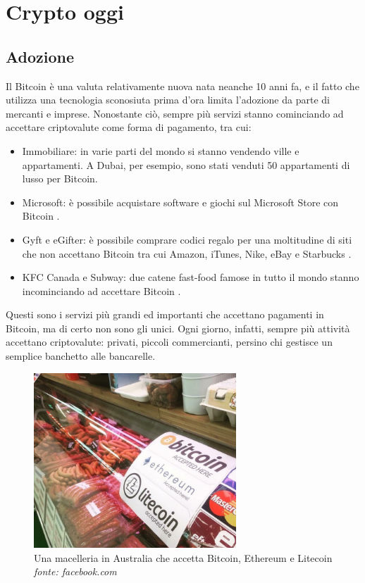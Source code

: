 \documentclass {article}
\begin{document}
\newpage
\null
\newpage


\section {Crypto oggi}


\subsection {Adozione}


Il Bitcoin è una valuta relativamente nuova nata neanche 10 anni fa, e il fatto che utilizza una tecnologia sconosiuta prima d'ora limita l'adozione da parte di mercanti e imprese.
Nonostante ciò, sempre più servizi stanno cominciando ad accettare criptovalute come forma di pagamento, tra cui:

\begin{itemize}
\item Immobiliare: in varie parti del mondo si stanno vendendo ville e appartamenti. A Dubai, per esempio, sono stati venduti 50 appartamenti di lusso per Bitcoin\cite{dubai}.
\item Microsoft: è possibile acquistare software e giochi sul Microsoft Store con Bitcoin \cite{accepting}.
\item Gyft e eGifter: è possibile comprare codici regalo per una moltitudine di siti che non accettano Bitcoin tra cui Amazon, iTunes, Nike, eBay e Starbucks \cite{accepting}. 
\item KFC Canada e Subway: due catene fast-food famose in tutto il mondo stanno incominciando ad accettare Bitcoin \cite{accepting}. 
\end{itemize}
%
Questi sono i servizi più grandi ed importanti che accettano pagamenti in Bitcoin, ma di certo non sono gli unici.
Ogni giorno, infatti, sempre più attività accettano criptovalute: privati, piccoli commercianti, persino chi gestisce un semplice banchetto alle bancarelle.

\vspace {0.5cm}
\begin{figure}[htb!]
\includegraphics [width = 7.6cm] {butchers.jpg}
\centering
\captionsetup{width=1.4\linewidth}
\caption {Una macelleria in Australia che accetta Bitcoin, Ethereum e Litecoin\\\textit{fonte: facebook.com}}
\end{figure}
\end{document}
